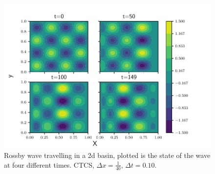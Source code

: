 \begin{figure}[htp]
  \centering
  \includegraphics[width=\textwidth]{../figures/bounded_2d.pdf}
  \caption{Rossby wave travelling in a 2d basin, plotted is the state of the wave  at four different times. CTCS, $\Delta x = \frac{1}{40}$, $\Delta t = 0.10$.}
  \label{fig:2d_bounded}
\end{figure}
